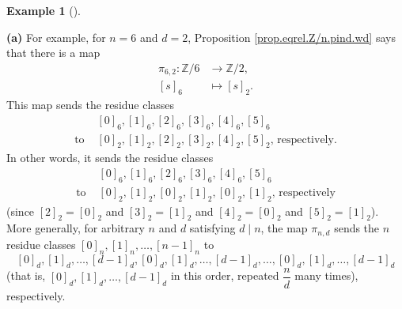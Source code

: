 \documentclass[numbers=enddot,12pt,final,onecolumn,notitlepage]{scrartcl}%
\numberwithin{exer}{subsection}
\theoremstyle{definition}
\newtheorem{exam}[theo]{Example}
\newenvironment{example}[1][]
{\begin{exam}[#1]\begin{leftbar}}
{\end{leftbar}\end{exam}}
\begin{document}
\begin{example}
\label{exa.eqrel.Z/n.pind.wd}\textbf{(a)} For example, for $n=6$ and $d=2$,
Proposition \ref{prop.eqrel.Z/n.pind.wd} says that there is a map
\begin{align*}
\pi_{6,2}:\mathbb{Z}/6  &  \rightarrow\mathbb{Z}/2,\\
\left[  s\right]  _{6}  &  \mapsto\left[  s\right]  _{2}.
\end{align*}
This map sends the residue classes
\begin{align*}
&  \left[  0\right]  _{6},\left[  1\right]  _{6},\left[  2\right]
_{6},\left[  3\right]  _{6},\left[  4\right]  _{6},\left[  5\right]  _{6}\\
\text{to }  &  \left[  0\right]  _{2},\left[  1\right]  _{2},\left[  2\right]
_{2},\left[  3\right]  _{2},\left[  4\right]  _{2},\left[  5\right]
_{2}\text{, respectively.}%
\end{align*}
In other words, it sends the residue classes%
\begin{align*}
&  \left[  0\right]  _{6},\left[  1\right]  _{6},\left[  2\right]
_{6},\left[  3\right]  _{6},\left[  4\right]  _{6},\left[  5\right]  _{6}\\
\text{to }  &  \left[  0\right]  _{2},\left[  1\right]  _{2},\left[  0\right]
_{2},\left[  1\right]  _{2},\left[  0\right]  _{2},\left[  1\right]
_{2}\text{, respectively}%
\end{align*}
(since $\left[  2\right]  _{2}=\left[  0\right]  _{2}$ and $\left[  3\right]
_{2}=\left[  1\right]  _{2}$ and $\left[  4\right]  _{2}=\left[  0\right]
_{2}$ and $\left[  5\right]  _{2}=\left[  1\right]  _{2}$). More generally,
for arbitrary $n$ and $d$ satisfying $d\mid n$, the map $\pi_{n,d}$ sends the
$n$ residue classes $\left[  0\right]  _{n},\left[  1\right]  _{n}%
,\ldots,\left[  n-1\right]  _{n}$ to
\[
\left[  0\right]  _{d},\left[  1\right]  _{d},\ldots,\left[  d-1\right]
_{d},\left[  0\right]  _{d},\left[  1\right]  _{d},\ldots,\left[  d-1\right]
_{d},\ldots,\left[  0\right]  _{d},\left[  1\right]  _{d},\ldots,\left[
d-1\right]  _{d}%
\]
(that is, $\left[  0\right]  _{d},\left[  1\right]  _{d},\ldots,\left[
d-1\right]  _{d}$ in this order, repeated $\dfrac{n}{d}$ many times), respectively.


\end{example}
\end{document}

